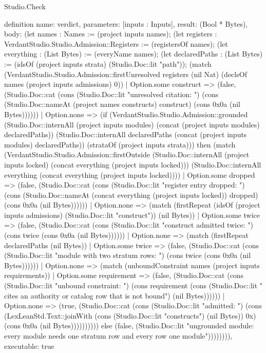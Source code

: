\begin{lexlean}{Studio.Check}
\begin{semanticmodule}
definition{
  name: verdict,
  parameters: [inputs : Inputs],
  result: (Bool * Bytes),
  body: (let names : Names := (project inputs names); (let registers : VerdantStudio.Studio.Admission::Registers := (registersOf names); (let everything : (List Bytes) := (everyName names); (let declaredPaths : (List Bytes) := (idsOf (project inputs strata) (Studio.Doc::lit "path")); (match (VerdantStudio.Studio.Admission::firstUnresolved registers (nil Nat) (declsOf names (project inputs admissions) 0))
    | Option.some construct => (false, (Studio.Doc::cat (cons (Studio.Doc::lit "unresolved citation: ") (cons (Studio.Doc::nameAt (project names constructs) construct) (cons 0x0a (nil Bytes))))))
    | Option.none => (if (VerdantStudio.Studio.Admission::grounded (Studio.Doc::internAll (project inputs modules) (concat (project inputs modules) declaredPaths)) (Studio.Doc::internAll declaredPaths (concat (project inputs modules) declaredPaths)) (strataOf (project inputs strata))) then (match (VerdantStudio.Studio.Admission::firstOutside (Studio.Doc::internAll (project inputs locked) (concat everything (project inputs locked))) (Studio.Doc::internAll everything (concat everything (project inputs locked))))
      | Option.some dropped => (false, (Studio.Doc::cat (cons (Studio.Doc::lit "register entry dropped: ") (cons (Studio.Doc::nameAt (concat everything (project inputs locked)) dropped) (cons 0x0a (nil Bytes))))))
      | Option.none => (match (firstRepeat (idsOf (project inputs admissions) (Studio.Doc::lit "construct")) (nil Bytes))
        | Option.some twice => (false, (Studio.Doc::cat (cons (Studio.Doc::lit "construct admitted twice: ") (cons twice (cons 0x0a (nil Bytes))))))
        | Option.none => (match (firstRepeat declaredPaths (nil Bytes))
          | Option.some twice => (false, (Studio.Doc::cat (cons (Studio.Doc::lit "module with two stratum rows: ") (cons twice (cons 0x0a (nil Bytes))))))
          | Option.none => (match (unboundConstraint names (project inputs requirements))
            | Option.some requirement => (false, (Studio.Doc::cat (cons (Studio.Doc::lit "unbound constraint: ") (cons requirement (cons (Studio.Doc::lit " cites an authority or catalog row that is not bound\n") (nil Bytes))))))
            | Option.none => (true, (Studio.Doc::cat (cons (Studio.Doc::lit "admitted: ") (cons (LexLeanStd.Text::joinWith (cons (Studio.Doc::lit "constructs") (nil Bytes)) 0x) (cons 0x0a (nil Bytes)))))))))) else (false, (Studio.Doc::lit "ungrounded module: every module needs one stratum row and every row one module\n")))))))),
  executable: true
}
\end{semanticmodule}
\end{lexlean}
